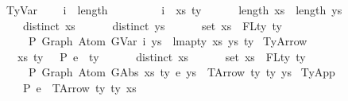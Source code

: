 \begin{isabellebody}
\isanewline
\ \ TyVar{\isacharcolon}{\kern0pt}\isanewline
\ \ \ \ {\isachardoublequoteopen}i\ {\isacharless}{\kern0pt}\ length\ {\isasymGamma}\ {\isacharequal}{\kern0pt}{\isacharequal}{\kern0pt}{\isachargreater}{\kern0pt}\isanewline
\ \ \ \ \ {\isasymGamma}\ {\isacharbang}{\kern0pt}\ i\ {\isacharequal}{\kern0pt}\ {\isacharparenleft}{\kern0pt}xs{\isacharcomma}{\kern0pt}\ ty{\isacharparenright}{\kern0pt}\ {\isacharequal}{\kern0pt}{\isacharequal}{\kern0pt}{\isachargreater}{\kern0pt}\isanewline
\ \ \ \ \ length\ xs\ {\isacharequal}{\kern0pt}\ length\ ys\ {\isacharequal}{\kern0pt}{\isacharequal}{\kern0pt}{\isachargreater}{\kern0pt}\isanewline
\ \ \ \ \ distinct\ xs\ {\isacharequal}{\kern0pt}{\isacharequal}{\kern0pt}{\isachargreater}{\kern0pt}\isanewline
\ \ \ \ \ distinct\ ys\ {\isacharequal}{\kern0pt}{\isacharequal}{\kern0pt}{\isachargreater}{\kern0pt}\isanewline
\ \ \ \ \ set\ xs\ {\isacharequal}{\kern0pt}\ FLty\ ty\ {\isacharequal}{\kern0pt}{\isacharequal}{\kern0pt}{\isachargreater}{\kern0pt}\isanewline
\ \ \ \ \ {\isasymGamma}\ {\isasymturnstile}{\isacharbraceleft}{\kern0pt}P{\isacharbraceright}{\kern0pt}\ Graph\ {\isacharparenleft}{\kern0pt}Atom\ {\isacharparenleft}{\kern0pt}GVar\ i{\isacharparenright}{\kern0pt}\ ys{\isacharparenright}{\kern0pt}\ {\isacharcolon}{\kern0pt}\ lmap{\isacharunderscore}{\kern0pt}ty\ xs\ ys\ ty{\isachardoublequoteclose}\isanewline
{\isacharbar}{\kern0pt}\ TyArrow{\isacharcolon}{\kern0pt}\isanewline
\ \ \ \ {\isachardoublequoteopen}{\isacharparenleft}{\kern0pt}xs{\isacharcomma}{\kern0pt}\ ty{}{\isacharparenright}{\kern0pt}\ {\isacharhash}{\kern0pt}\ {\isasymGamma}\ {\isasymturnstile}{\isacharbraceleft}{\kern0pt}P{\isacharbraceright}{\kern0pt}\ e\ {\isacharcolon}{\kern0pt}\ ty{}\ {\isacharequal}{\kern0pt}{\isacharequal}{\kern0pt}{\isachargreater}{\kern0pt}\isanewline
\ \ \ \ \ distinct\ xs\ {\isacharequal}{\kern0pt}{\isacharequal}{\kern0pt}{\isachargreater}{\kern0pt}\isanewline
\ \ \ \ \ set\ xs\ {\isacharequal}{\kern0pt}\ FLty\ ty{}\ {\isacharequal}{\kern0pt}{\isacharequal}{\kern0pt}{\isachargreater}{\kern0pt}\isanewline
\ \ \ \ \ {\isasymGamma}\ {\isasymturnstile}{\isacharbraceleft}{\kern0pt}P{\isacharbraceright}{\kern0pt}\ Graph\ {\isacharparenleft}{\kern0pt}Atom\ {\isacharparenleft}{\kern0pt}GAbs\ xs\ ty{}\ e{\isacharparenright}{\kern0pt}\ ys{\isacharparenright}{\kern0pt}\ {\isacharcolon}{\kern0pt}\ TArrow\ ty{}\ ty{}\ ys{\isachardoublequoteclose}\isanewline
{\isacharbar}{\kern0pt}\ TyApp{\isacharcolon}{\kern0pt}\isanewline
\ \ \ \ {\isachardoublequoteopen}{\isasymGamma}\ {\isasymturnstile}{\isacharbraceleft}{\kern0pt}P{\isacharbraceright}{\kern0pt}\ e{}\ {\isacharcolon}{\kern0pt}\ TArrow\ ty{}\ ty{}\ xs\ {\isacharequal}{\kern0pt}{\isacharequal}{\kern0pt}{\isachargreater}{\kern0pt}\isanewline

\end{isabellebody}
